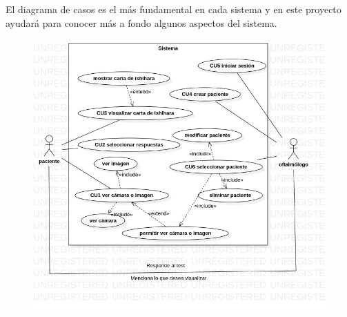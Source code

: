 \documentclass[10pt]{article}
\begin{document}
El diagrama de casos es el más fundamental en cada sistema y en este proyecto ayudará para conocer más a fondo algunos aspectos del sistema.

\begin{figure}[H]
	\begin{center}
\includegraphics[scale = 0.60]{UML/UseCaseDiagram1.jpg}
	\end{center} 
\end{figure}

\newpage
\end{document}
